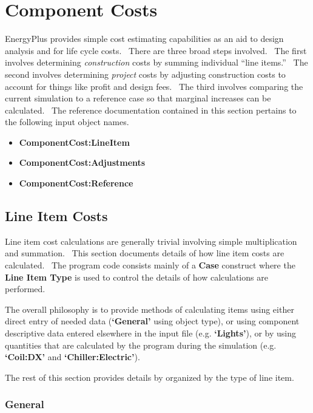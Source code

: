 \section{Component Costs}\label{component-costs}

EnergyPlus provides simple cost estimating capabilities as an aid to design analysis and for life cycle costs.~ There are three broad steps involved.~ The first involves determining \emph{construction} costs by summing individual ``line items.''~ The second involves determining \emph{project} costs by adjusting construction costs to account for things like profit and design fees.~ The third involves comparing the current simulation to a reference case so that marginal increases can be calculated.~ The reference documentation contained in this section pertains to the following input object names.

\begin{itemize}
\item
  \textbf{ComponentCost:LineItem}
\item
  \textbf{ComponentCost:Adjustments}
\item
  \textbf{ComponentCost:Reference}
\end{itemize}

\subsection{Line Item Costs}\label{line-item-costs}

Line item cost calculations are generally trivial involving simple multiplication and summation.~ This section documents details of how line item costs are calculated.~ The program code consists mainly of a \textbf{Case} construct where the \textbf{Line Item Type} is used to control the details of how calculations are performed.

The overall philosophy is to provide methods of calculating items using either direct entry of needed data (\textbf{`General'} using object type), or using component descriptive data entered elsewhere in the input file (e.g. \textbf{`Lights'}), or by using quantities that are calculated by the program during the simulation (e.g. \textbf{`Coil:DX'} and \textbf{`Chiller:Electric'}).

The rest of this section provides details by organized by the type of line item.

\subsubsection{General}\label{general}

